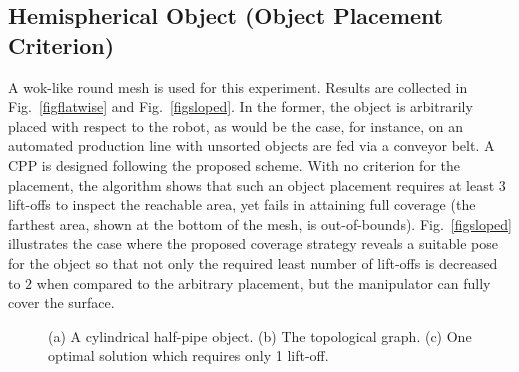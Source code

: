 \documentclass[journal]{IEEEtran}
\begin{document}
\subsection{Hemispherical Object (Object Placement Criterion)}
\label{sec:wok_sim_examples}
A wok-like round mesh is used for this experiment. Results are collected in Fig.~\ref{figflatwise} and Fig.~\ref{figsloped}. 
In the former, the object is arbitrarily placed with respect to the robot, as would be the case, for instance, on an automated production line with unsorted objects are fed via a conveyor belt. A CPP is designed following the proposed scheme. With no criterion for the placement, the algorithm shows that such an object placement requires at least $3$ lift-offs to inspect the reachable area, yet fails in attaining full coverage (the farthest area, shown at the bottom of the mesh, is out-of-bounds).
Fig.~\ref{figsloped} illustrates the case where the proposed coverage strategy reveals a suitable pose for the object so that not only the required least number of lift-offs is decreased to $2$ when compared to the arbitrary placement, 
but the manipulator can fully cover the surface.

\begin{figure}[t]
\centering
{} \qquad
{} \qquad
{}
\caption{(a) A cylindrical half-pipe object. (b) The topological graph. (c) One optimal solution which requires only 1 lift-off.}
\label{fighalfpipe}
\end{figure}
\end{document}
